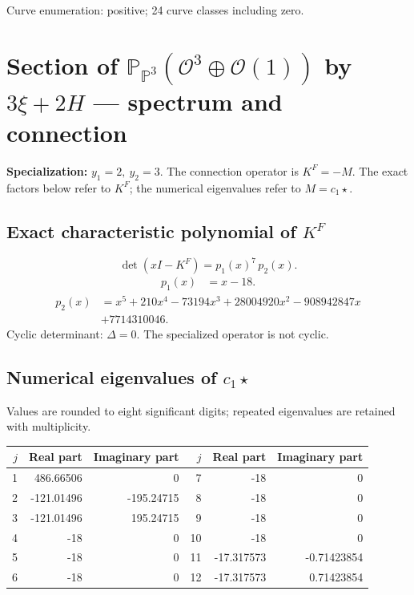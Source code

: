 \documentclass[10pt,a4paper]{article}
\begin{document}
Curve enumeration: positive; 24 curve classes including zero.
\clearpage\section*{Section of $\mathbb P_{\mathbb P^{3}}(\mathcal O^{3}\oplus \mathcal O(1))$ by $3\xi +2H$ --- spectrum and connection}
\textbf{Specialization:} $y_1=2,\ y_2=3$. The connection operator is $K^F=-M$. The exact factors below refer to $K^F$; the numerical eigenvalues refer to $M=c_1\star$.
\subsection*{Exact characteristic polynomial of $K^F$}
\[\det(xI-K^F)=p_{1}(x)^{7}\,p_{2}(x).\]
\[\begin{aligned}p_{1}(x)&=x - 18.\end{aligned}\]
\[\begin{aligned}p_{2}(x)&=x^{5} + 210 x^{4} - 73194 x^{3} + 28004920 x^{2} - 908942847 x\\&+7714310046.\end{aligned}\]
Cyclic determinant: $\Delta=0$. The specialized operator is not cyclic.
\subsection*{Numerical eigenvalues of $c_1\star$}
Values are rounded to eight significant digits; repeated eigenvalues are retained with multiplicity.
\begin{center}\small\begin{tabular}{rrr@{\qquad}rrr}\toprule $j$ & Real part & Imaginary part & $j$ & Real part & Imaginary part\\\midrule
1 & 486.66506 & 0 & 7 & -18 & 0\\
2 & -121.01496 & -195.24715 & 8 & -18 & 0\\
3 & -121.01496 & 195.24715 & 9 & -18 & 0\\
4 & -18 & 0 & 10 & -18 & 0\\
5 & -18 & 0 & 11 & -17.317573 & -0.71423854\\
6 & -18 & 0 & 12 & -17.317573 & 0.71423854\\
\bottomrule\end{tabular}\end{center}
\end{document}
